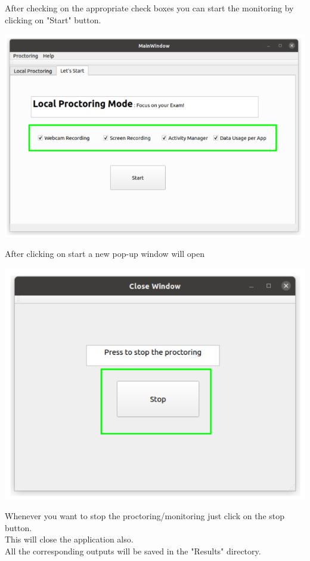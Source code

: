 \documentclass{article}
\begin{document}
After checking on the appropriate check boxes you can start the monitoring by clicking on "Start" button.\\
\begin{center}
\includegraphics[scale=0.8]{checkbox.png}    
\end{center}
After clicking on start a new pop-up window will open\\
\begin{center}
\includegraphics[scale=0.5]{close.png}    
\end{center}
Whenever you want to stop the proctoring/monitoring just click on the stop button.\\
This will close the application also.\\
All the corresponding outputs will be saved in the "Results" directory.\\
\end{document}

